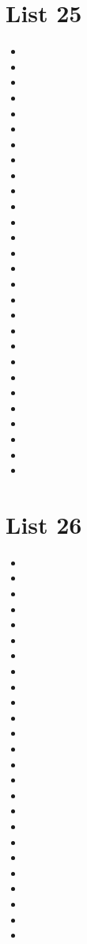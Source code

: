 \documentclass[a4paper,10pt]{article}
\begin{document}
\begin{CJK*}{UTF8}{gkai}
\section{List 25}
\begin{itemize}
\item 
\item 
\item 
\item 
\item 
\item 
\item 
\item 
\item 
\item 
\item 
\item 
\item 
\item 
\item 
\item 
\item 
\item 
\item 
\item 
\item 
\item 
\item 
\item 
\item 
\item 
\item 
\item 
\end{itemize}

\newpage
\section{List 26}
\begin{itemize}
\item 
\item 
\item 
\item 
\item 
\item 
\item 
\item 
\item 
\item 
\item 
\item 
\item 
\item 
\item 
\item 
\item 
\item 
\item 
\item 
\item 
\item 
\item 
\item 
\item 
\end{itemize}


\end{CJK*}
\end{document}
